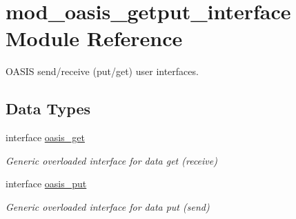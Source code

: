\hypertarget{classmod__oasis__getput__interface}{\section{mod\+\_\+oasis\+\_\+getput\+\_\+interface Module Reference}
\label{classmod__oasis__getput__interface}
}


O\+A\+S\+I\+S send/receive (put/get) user interfaces.  


\subsection*{Data Types}
\begin{DoxyCompactItemize}
\item 
interface \hyperlink{interfacemod__oasis__getput__interface_1_1oasis__get}{oasis\+\_\+get}
\begin{DoxyCompactList}\small\item\em Generic overloaded interface for data get (receive) \end{DoxyCompactList}\item 
interface \hyperlink{interfacemod__oasis__getput__interface_1_1oasis__put}{oasis\+\_\+put}
\begin{DoxyCompactList}\small\item\em Generic overloaded interface for data put (send) \end{DoxyCompactList}\end{DoxyCompactItemize}
